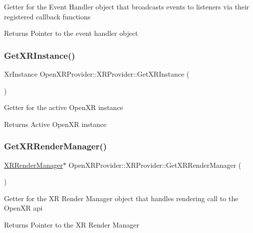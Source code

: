 Getter for the Event Handler object that broadcasts events to listeners via their registered callback functions \begin{DoxyReturn}{Returns}
Pointer to the event handler object 
\end{DoxyReturn}
\mbox{\label{class_open_x_r_provider_1_1_x_r_provider_ae83367900d79cacfa6ad3ad78e8bb400}} 
\subsubsection{\texorpdfstring{GetXRInstance()}{GetXRInstance()}}
{\footnotesize\ttfamily Xr\+Instance Open\+X\+R\+Provider\+::\+X\+R\+Provider\+::\+Get\+X\+R\+Instance (\begin{DoxyParamCaption}{ }\end{DoxyParamCaption})\hspace{0.3cm}{\ttfamily [inline]}}

Getter for the active Open\+XR instance \begin{DoxyReturn}{Returns}
Active Open\+XR instance 
\end{DoxyReturn}
\mbox{\label{class_open_x_r_provider_1_1_x_r_provider_ad52ba9333ec9c84e0e2476e822982c49}} 
\subsubsection{\texorpdfstring{GetXRRenderManager()}{GetXRRenderManager()}}
{\footnotesize\ttfamily \mbox{\hyperlink{class_open_x_r_provider_1_1_x_r_render_manager}{X\+R\+Render\+Manager}}$\ast$ Open\+X\+R\+Provider\+::\+X\+R\+Provider\+::\+Get\+X\+R\+Render\+Manager (\begin{DoxyParamCaption}{ }\end{DoxyParamCaption})\hspace{0.3cm}{\ttfamily [inline]}}

Getter for the XR Render Manager object that handles rendering call to the Open\+XR api \begin{DoxyReturn}{Returns}
Pointer to the XR Render Manager 
\end{DoxyReturn}
\mbox{\label{class_open_x_r_provider_1_1_x_r_provider_afc3d098badae996ec4f44db94e9a954c}} 
